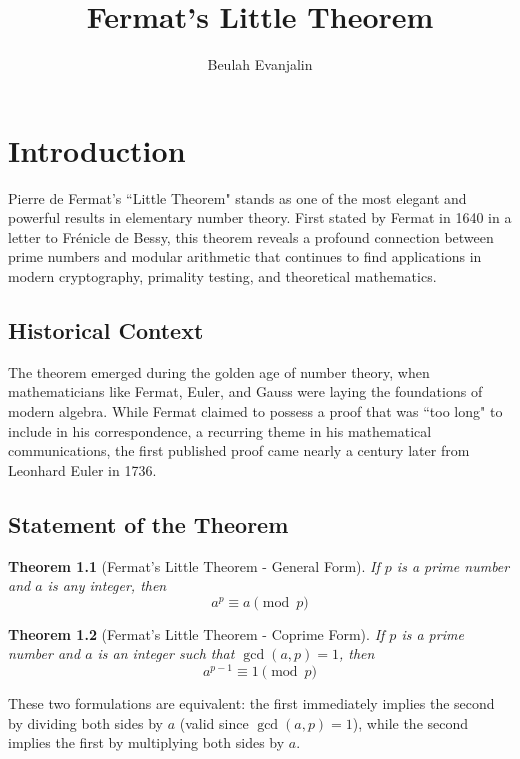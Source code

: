 \documentclass[12pt,openany]{book}
\title{Fermat's Little Theorem}
\author{Beulah Evanjalin}
\date{}
\theoremstyle{definition}
\theoremstyle{plain}
\newtheorem{theorem}{Theorem}[chapter]
\theoremstyle{remark}
\begin{document}
\maketitle

\tableofcontents

\chapter{Introduction}

Pierre de Fermat's ``Little Theorem" stands as one of the most elegant and powerful results in elementary number theory. First stated by Fermat in 1640 in a letter to Frénicle de Bessy, this theorem reveals a profound connection between prime numbers and modular arithmetic that continues to find applications in modern cryptography, primality testing, and theoretical mathematics.

\section{Historical Context}

The theorem emerged during the golden age of number theory, when mathematicians like Fermat, Euler, and Gauss were laying the foundations of modern algebra. While Fermat claimed to possess a proof that was ``too long" to include in his correspondence, a recurring theme in his mathematical communications, the first published proof came nearly a century later from Leonhard Euler in 1736.

\section{Statement of the Theorem}

\begin{theorem}[Fermat's Little Theorem - General Form]
If $p$ is a prime number and $a$ is any integer, then
\[
a^p \equiv a \pmod{p}
\]
\end{theorem}

\begin{theorem}[Fermat's Little Theorem - Coprime Form]
If $p$ is a prime number and $a$ is an integer such that $\gcd(a,p) = 1$, then
\[
a^{p-1} \equiv 1 \pmod{p}
\]
\end{theorem}
\noindent
These two formulations are equivalent: the first immediately implies the second by dividing both sides by $a$ (valid since $\gcd(a,p) = 1$), while the second implies the first by multiplying both sides by $a$.
\end{document}
